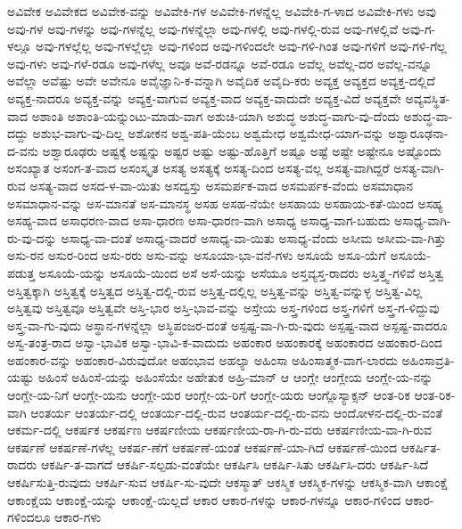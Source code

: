 {ಅವಿವೇಕ
ಅವಿವೇಕದ
ಅವಿವೇಕ-ವನ್ನು
ಅವಿವೇಕಿ-ಗಳ
ಅವಿವೇಕಿ-ಗಳನ್ನೆಲ್ಲ
ಅವಿವೇಕಿ-ಗ-ಳಾದ
ಅವಿವೇಕಿ-ಗಳು
ಅವು
ಅವು-ಗಳ
ಅವು-ಗಳನ್ನು
ಅವು-ಗಳನ್ನೆಲ್ಲ
ಅವು-ಗಳನ್ನೆಲ್ಲಾ
ಅವು-ಗಳಲ್ಲಿ
ಅವು-ಗಳಲ್ಲಿ-ರುವ
ಅವು-ಗಳಲ್ಲಿವೆ
ಅವು-ಗ-ಳಲ್ಲೂ
ಅವು-ಗಳಲ್ಲೆಲ್ಲ
ಅವು-ಗಳಲ್ಲೆಲ್ಲಾ
ಅವು-ಗಳಿಂದ
ಅವು-ಗಳಿಂದಲೇ
ಅವು-ಗಳಿ-ಗಿಂತ
ಅವು-ಗಳಿಗೆ
ಅವು-ಗಳಿ-ಗೆಲ್ಲ
ಅವು-ಗಳು
ಅವು-ಗಳೆ-ರಡೂ
ಅವು-ಗಳೆಲ್ಲ
ಅವೂ
ಅವೆ-ರಡನ್ನೂ
ಅವೆ-ರಡೂ
ಅವೆಲ್ಲ
ಅವೆಲ್ಲ-ದರ
ಅವೆಲ್ಲ-ವನ್ನೂ
ಅವೆಲ್ಲಾ
ಅವೆಷ್ಟು
ಅವೇ
ಅವೇನೂ
ಅವೈಜ್ಞಾನಿ-ಕ-ವನ್ನಾಗಿ
ಅವೈದಿಕ
ಅವೈದಿ-ಕರು
ಅವ್ಯಕ್ತ
ಅವ್ಯಕ್ತದ
ಅವ್ಯಕ್ತ-ದಲ್ಲಿದೆ
ಅವ್ಯಕ್ತ-ನಾದರೂ
ಅವ್ಯಕ್ತ-ವನ್ನು
ಅವ್ಯಕ್ತ-ವಾಗುವ
ಅವ್ಯಕ್ತ-ವಾದ
ಅವ್ಯಕ್ತ-ವಾದುದೇ
ಅವ್ಯಕ್ತ-ವಿದೆ
ಅವ್ಯಕ್ತವೇ
ಅವ್ಯವಸ್ಥಿತ-ವಾದ
ಅಶಾಂತಿ
ಅಶಾಂತಿ-ಯನ್ನುಂಟು-ಮಾಡು-ವಾಗ
ಅಶುಚಿ-ಯಾಗಿ
ಅಶುದ್ಧ
ಅಶುದ್ಧ-ವಾಗು-ವು-ದೆಂದು
ಅಶುದ್ಧ-ವಾ-ದದ್ದು
ಅಶುಭ-ವಾಗು-ವು-ದಿಲ್ಲ
ಅಶೋಕನ
ಅಶ್ವ-ಪತಿ-ಯೆಂಬ
ಅಶ್ವಮೇಧ
ಅಶ್ವಮೇಧ-ಯಾಗ-ವನ್ನು
ಅಶ್ವಾರೂಢನಾ-ದ-ವನು
ಅಶ್ವಾರೂಢರು
ಅಷ್ಟಕ್ಕೆ
ಅಷ್ಟನ್ನು
ಅಷ್ಟರ
ಅಷ್ಟು
ಅಷ್ಟು-ಹೊತ್ತಿಗೆ
ಅಷ್ಟೂ
ಅಷ್ಟೆ
ಅಷ್ಟೇ
ಅಷ್ಟೇನೂ
ಅಷ್ಟೊಂದು
ಅಸಂಖ್ಯಾತ
ಅಸಂಗ-ತ-ವಾದ
ಅಸಂಸ್ಕೃತ
ಅಸತ್ಯ
ಅಸತ್ಯಕ್ಕೆ
ಅಸತ್ಯ-ದಿಂದ
ಅಸತ್ಯ-ವಲ್ಲ
ಅಸತ್ಯ-ವಾಗಿದ್ದರೆ
ಅಸತ್ಯ-ವಾಗಿ-ರುವ
ಅಸತ್ಯ-ವಾದ
ಅಸದ-ಳ-ವಾ-ಯಿತು
ಅಸದ್ವಸ್ತು
ಅಸಮರ್ಪಕ-ವಾದ
ಅಸಮರ್ಪಕ-ವೆಂದು
ಅಸಮಾಧಾನ
ಅಸಮಾಧಾನ-ವನ್ನು
ಅಸ-ಮಾನತೆ
ಅಸ-ಮಾನಸ್ಥ
ಅಸಹ
ಅಸಹ-ನೆಯೇ
ಅಸಹಾಯ
ಅಸಹಾಯ-ಕತೆ-ಯಿಂದ
ಅಸಹ್ಯ
ಅಸಹ್ಯ-ವಾದ
ಅಸಾಧರಣ-ವಾದ
ಅಸಾ-ಧಾರಣ
ಅಸಾ-ಧಾರಣ-ವಾಗಿ
ಅಸಾಧ್ಯ
ಅಸಾಧ್ಯ-ವಾಗ-ಬಹುದು
ಅಸಾಧ್ಯ-ವಾಗಿ-ರು-ವು-ದನ್ನು
ಅಸಾಧ್ಯ-ವಾ-ದಂತೆ
ಅಸಾಧ್ಯ-ವಾದರೆ
ಅಸಾಧ್ಯ-ವಾ-ಯಿತು
ಅಸಾಧ್ಯ-ವೆಂದು
ಅಸೀಮ
ಅಸೀಮ-ವಾ-ಗಿತ್ತು
ಅಸು-ರನ
ಅಸುರ-ರಿಂದ
ಅಸು-ರರು
ಅಸು-ವನ್ನು
ಅಸೂಯಾ-ಭಾ-ವನೆ-ಗಳು
ಅಸೂಯೆ
ಅಸೂ-ಯೆಗೆ
ಅಸೂಯೆ-ಪಡುತ್ತ
ಅಸೂಯೆ-ಯನ್ನು
ಅಸೂಯೆ-ಯಿಂದ
ಅಸೆ
ಅಸೆ-ಯನ್ನು
ಅಸೆಯೂ
ಅಸ್ತವ್ಯಸ್ತ-ರಾದರು
ಅಸ್ತಿತ್ತ್ವ-ಗಳಿವೆ
ಅಸ್ತಿತ್ವ
ಅಸ್ತಿತ್ವಕ್ಕಾಗಿ
ಅಸ್ತಿತ್ವಕ್ಕೆ
ಅಸ್ತಿತ್ವದ
ಅಸ್ತಿತ್ವ-ದಲ್ಲಿ-ರುವ
ಅಸ್ತಿತ್ವ-ದಲ್ಲಿಲ್ಲ
ಅಸ್ತಿತ್ವ-ವನ್ನು
ಅಸ್ತಿತ್ವ-ವನ್ನುಳ್ಳ
ಅಸ್ತಿತ್ವ-ವಿಲ್ಲ
ಅಸ್ತಿತ್ವವು
ಅಸ್ತಿತ್ವವೂ
ಅಸ್ತಿತ್ವವೇ
ಅಸ್ತಿ-ಭಾರ
ಅಸ್ತಿ-ಭಾವ-ವನ್ನು
ಅಸ್ತೇಯ
ಅಸ್ತ್ರ-ಗಳಿಂದ
ಅಸ್ತ್ರ-ಗಳಿಗೆ
ಅಸ್ತ್ರ-ಗ-ಳಿದ್ದುವು
ಅಸ್ತ್ರ-ವಾ-ಗು-ವುದು
ಅಸ್ಥಾನ-ಗಳನ್ನೆಲ್ಲಾ
ಅಸ್ಥಿಪಂಜರ-ದಂತೆ
ಅಸ್ಪಷ್ಟ-ವಾ-ಗಿ-ರು-ವುದು
ಅಸ್ಪಷ್ಟ-ವಾದ
ಅಸ್ಪಷ್ಟ-ವಾದರೂ
ಅಸ್ವ-ತಂತ್ರ-ರಾದ
ಅಸ್ವಾ-ಭಾವಿಕ
ಅಸ್ವಾ-ಭಾವಿ-ಕ-ವಾದುದು
ಅಹಂಕಾರ
ಅಹಂಕಾರಕ್ಕೆ
ಅಹಂಕಾರದ
ಅಹಂಕಾರ-ದಿಂದ
ಅಹಂಕಾರ-ವನ್ನು
ಅಹಂಕಾರ-ವಿರುವುದೋ
ಅಹಂಭಾವ
ಅಹಲ್ಯಾ
ಅಹಿಂಸಾ
ಅಹಿಂಸಾತ್ಮಕ-ವಾಗ-ಲಾರದು
ಅಹಿಂಸಾವ್ರತಿ-ಯಷ್ಟು
ಅಹಿಂಸೆ
ಅಹಿಂಸೆ-ಯನ್ನು
ಅಹಿಂಸೆಯೇ
ಅಹೇತುಕ
ಅಹ್ರಿ-ಮಾನ್
ಆ
ಆಂಗ್ಲೇ
ಆಂಗ್ಲೇಯ
ಆಂಗ್ಲೇ-ಯ-ನನ್ನು
ಆಂಗ್ಲೇ-ಯ-ನಿಗೆ
ಆಂಗ್ಲೇ-ಯನು
ಆಂಗ್ಲೇ-ಯರ
ಆಂಗ್ಲೇ-ಯ-ರಿಗೆ
ಆಂಗ್ಲೇ-ಯರು
ಆಂಗ್ಲೊಸ್ಯಾಕ್ಸನ್
ಆಂತ-ರಿಕ
ಆಂತ-ರಿಕ-ವಾಗಿ
ಆಂತರ್ಯ
ಆಂತರ್ಯ-ದಲ್ಲಿ
ಆಂತರ್ಯ-ದಲ್ಲಿ-ರುವ
ಆಂತರ್ಯ-ದಲ್ಲಿ-ರು-ವನು
ಆಂದೋಳನ-ದಲ್ಲಿ-ರು-ವಂತೆ
ಆಕರ್ಮ-ದಲ್ಲಿ
ಆಕರ್ಷಕ
ಆಕರ್ಷಣ
ಆಕರ್ಷಣೀಯ
ಆಕರ್ಷಣೀಯ-ರಾ-ಗಿ-ರು-ವರು
ಆಕರ್ಷಣೀಯ-ವಾ-ಗಿ-ರುವ
ಆಕರ್ಷಣೆ
ಆಕರ್ಷಣೆ-ಗಳೆಲ್ಲ
ಆಕರ್ಷ-ಣೆಗೆ
ಆಕರ್ಷಣೆ-ಯಂತೆ
ಆಕರ್ಷಣೆ-ಯಾ-ಗಿದೆ
ಆಕರ್ಷಣೆ-ಯಿಂದ
ಆಕರ್ಷಿತ-ರಾದರು
ಆಕರ್ಷಿ-ತ-ವಾಗದೆ
ಆಕರ್ಷಿ-ಸಲ್ಪಡು-ವಂತೆಯೇ
ಆಕರ್ಷಿಸಿ
ಆಕರ್ಷಿ-ಸಿತು
ಆಕರ್ಷಿಸಿ-ದರು
ಆಕರ್ಷಿ-ಸಿದೆ
ಆಕರ್ಷಿಸುತ್ತಿ-ರುವುದು
ಆಕರ್ಷಿ-ಸುವ
ಆಕರ್ಷಿ-ಸು-ವುದೇ
ಆಕಸ್ಮಾತ್
ಆಕಸ್ಮಿಕ
ಆಕಸ್ಮಿಕ-ಗಳನ್ನು
ಆಕಸ್ಮಿಕ-ವಾಗಿ
ಆಕಾಂಕ್ಷೆ
ಆಕಾಂಕ್ಷೆಯ
ಆಕಾಂಕ್ಷೆ-ಯನ್ನು
ಆಕಾಂಕ್ಷೆ-ಯಿಲ್ಲದೆ
ಆಕಾರ
ಆಕಾರ-ಗಳನ್ನು
ಆಕಾರ-ಗಳನ್ನೂ
ಆಕಾರ-ಗಳಿಂದ
ಆಕಾರ-ಗಳಿಂದಲೂ
ಆಕಾರ-ಗಳು
}
